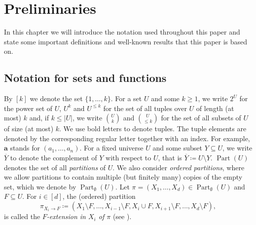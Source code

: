 \documentclass{lmcs}
\theoremstyle{plain}\newtheorem{claim}[thm]{Claim}   %
\DeclareMathOperator{\partitions}{Part}
\newcommand{\partitionsEmpty}{\ensuremath{\partitions_\emptyset}}
\newcommand{\ext}{\ensuremath{\rightarrow}}
\newcommand{\complementOf}[1]{\ensuremath{\overline{#1}}}
\newcommand{\tup}[1]{\ensuremath{\boldsymbol{#1}}}
\begin{document}
\section{Preliminaries}
\label{ch:prelim}
In this chapter we will introduce the notation used throughout this paper and state some important definitions and well-known results that this paper is based on.

\subsection{Notation for sets and functions}
By $[k]$ we denote the set $\{1, \dots, k\}$.
For a set $U$ and some $k\geq 1$, we write $2^U$ for the power set of $U$, $U^k$ and $U^{\leq k}$ 
for the set of all tuples over $U$ of length (at most) $k$ and, if $k\leq |U|$, we write $\binom{U}{k}$ and $\binom{U}{\leq k}$ for the set of all subsets of $U$ of size (at most) $k$.
We use bold letters to denote tuples.
The tuple elements are denoted by the corresponding regular letter together with an index.
For example, $\tup{a}$ stands for $(a_1, \dots, a_n)$.
For a fixed universe $U$ and some subset $Y\subseteq U$, we write $\complementOf{Y}$ to denote the complement of $Y$ with respect to $U$, that is $\complementOf{Y}\coloneqq U\setminus Y$.
$\partitions(U)$ denotes the set of all \emph{partitions} of $U$.
We also consider \emph{ordered partitions}, where we allow partitions to contain multiple (but finitely many) copies of the empty set, which we denote by $\partitionsEmpty(U)$.
Let $\pi=(X_1,\ldots,X_d)\in\partitionsEmpty(U)$ and $F\subseteq U$.
For $i\in[d]$, the (ordered) partition
\[
\pi_{X_i\ext F}\coloneqq (X_1\setminus F, \ldots, X_{i-1}\setminus F, X_i\cup F,X_{i+1}\setminus F,\ldots,X_d\setminus F),
\]
is called the \emph{$F$-extension in $X_i$ of $\pi$} (see \cite{Amini_submod-partition_09}).
\end{document}
